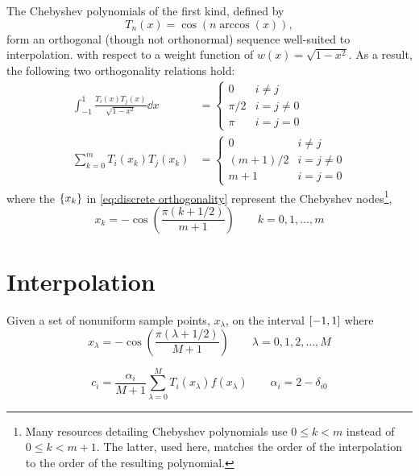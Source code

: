 The Chebyshev polynomials of the first kind, defined by
\begin{equation}
  T_n(x) = \cos(n \arccos(x)),
  \label{eq:chebyshev}
\end{equation}
form an orthogonal (though not orthonormal) sequence well-suited to interpolation.
with respect to a weight function of $w(x) = \sqrt{1 - x^2}$.
As a result, the following two orthogonality relations hold:
\begin{subequations}
  \begin{align}
    \int_{-1}^1 \frac{T_i(x) T_j(x)}{\sqrt{1 - x^2}} \dd{x} &= 
    \begin{cases}
      0 & i \not = j \\
      \pi / 2 & i = j \not = 0 \\
      \pi & i = j = 0
    \end{cases} \label{eq:continuous orthogonality} \\
    \sum_{k = 0}^{m} T_i(x_k) T_j(x_k) &= 
    \begin{cases}
      0 & i \not = j \\
      (m + 1)/2 & i = j \not = 0 \\
      m + 1 & i = j = 0
    \end{cases}
    \label{eq:discrete orthogonality}
  \end{align}
\end{subequations}
where the $\qty{x_k}$ in \cref{eq:discrete orthogonality} represent the Chebyshev nodes\footnote{Many resources detailing Chebyshev polynomials use $0 \leqslant k < m$ instead of $0 \leqslant k < m + 1$. The latter, used here, matches the order of the interpolation to the order of the resulting polynomial.},
\begin{equation}
  x_k = -\cos(\frac{\pi(k + 1/2)}{m +1}) \qquad k = 0, 1, \ldots, m
\end{equation}

\section{Interpolation}

Given a set of nonuniform sample points, $x_\lambda$, on the interval $\qty[-1, 1]$ where
\begin{equation}
  x_\lambda = -\cos(\frac{\pi (\lambda + 1/2)}{M + 1}) \qquad \lambda = 0, 1, 2, \ldots, M
\end{equation}

\begin{equation}
  c_i = \frac{\alpha_{i}}{M + 1}\sum_{\lambda = 0}^M T_{i}(x_\lambda) f(x_\lambda) \qquad \alpha_i = 2 - \delta_{i0}
\end{equation}

